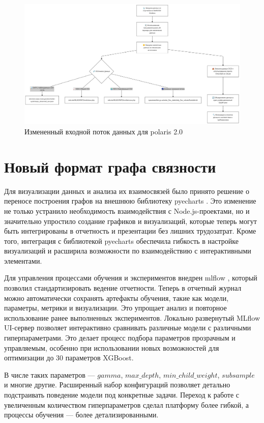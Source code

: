 \documentclass[14pt, a4paper]{bsu}
\begin{document}
\begin{figure}[htbp] \centering
	\includegraphics[width=1.0\textwidth]{polaris_data_flow} \caption{Измененный
		входной поток данных для polaris 2.0} \label{fig:polaris_data_flow}
\end{figure}

\section{Новый формат графа связности}

Для визуализации данных и анализа их взаимосвязей было принято решение о
переносе построения графов на внешнюю библиотеку pyecharts
\cite{pyecharts_docs}. Это изменение не только устранило необходимость
взаимодействия с Node.js-проектами, но и значительно упростило создание
графиков и визуализаций, которые теперь могут быть интегрированы в отчетность и
презентации без лишних трудозатрат. Кроме того, интеграция с библиотекой
pyecharts обеспечила гибкость в настройке визуализаций и расширила возможности
по взаимодействию с интерактивными элементами.

Для управления процессами обучения и экспериментов внедрен mlflow
\cite{mlflow_docs}, который позволил стандартизировать ведение отчетности.
Теперь в отчетный журнал можно автоматически сохранять артефакты обучения,
такие как модели, параметры, метрики и визуализации. Это упрощает анализ и
повторное использование ранее выполненных экспериментов. Локально развернутый
MLflow UI-сервер позволяет интерактивно сравнивать различные модели с
различными гиперпараметрами. Это делает процесс подбора параметров прозрачным и
управляемым, особенно при использовании новых возможностей для оптимизации до
30 параметров XGBoost.

В числе таких параметров — $gamma$, $max\_depth$, $min\_child\_weight$,
$subsample$ и многие другие. Расширенный набор конфигураций позволяет детально
подстраивать поведение модели под конкретные задачи. Переход к работе с
увеличенным количеством гиперпараметров сделал платформу более гибкой, а
процессы обучения — более детализированными.
\end{document}
